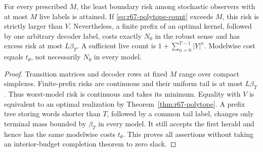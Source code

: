 \begin{proposition}\label{prop:r67-density}
For every prescribed $M$, the least boundary risk among stochastic observers with at most $M$ live labels is attained. If \eqref{eq:r67-polytope-count} exceeds $M$, this risk is strictly larger than $V$. Nevertheless, a finite prefix of an optimal kernel, followed by one arbitrary decoder label, costs exactly $N_0$ in the robust sense and has excess risk at most $L\beta_T$. A sufficient live count is $1+\sum_{n=0}^{T-1}|Y|^n$. Modelwise cost equals $t_\theta$, not necessarily $N_0$ in every model.
\end{proposition}
\begin{proof}
Transition matrices and decoder rows at fixed $M$ range over compact simplexes. Finite-prefix risks are continuous and their uniform tail is at most $L\beta_T$. Thus worst-model risk is continuous and takes its minimum. Equality with $V$ is equivalent to an optimal realization by Theorem~\ref{thm:r67-polytope}. A prefix tree storing words shorter than $T$, followed by a common tail label, changes only terminal mass bounded by $\beta_T$ in every model. It still accepts the first herald and hence has the same modelwise costs $t_\theta$. This proves all assertions without taking an interior-budget completion theorem to zero slack.
\end{proof}
